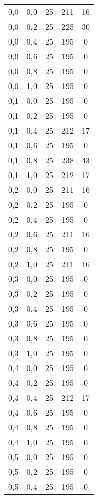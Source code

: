 \begin{center}
\begin{scriptsize}
\begin{longtable}[h]{| c | c | c || c | c |}
		0,0 & 0,0 & 25 & 211 & 16        \\
		0,0 & 0,2 & 25 & 225 & 30        \\
		0,0 & 0,4 & 25 & 195 & 0         \\
		0,0 & 0,6 & 25 & 195 & 0         \\
		0,0 & 0,8 & 25 & 195 & 0         \\
		0,0 & 1,0 & 25 & 195 & 0         \\
		\hline
		0,1 & 0,0 & 25 & 195 & 0         \\
		0,1 & 0,2 & 25 & 195 & 0         \\
		0,1 & 0,4 & 25 & 212 & 17        \\
		0,1 & 0,6 & 25 & 195 & 0         \\
		0,1 & 0,8 & 25 & 238 & 43        \\
		0,1 & 1,0 & 25 & 212 & 17        \\
		\hline
		0,2 & 0,0 & 25 & 211 & 16        \\
		0,2 & 0,2 & 25 & 195 & 0         \\
		0,2 & 0,4 & 25 & 195 & 0         \\
		0,2 & 0,6 & 25 & 211 & 16        \\
		0,2 & 0,8 & 25 & 195 & 0         \\
		0,2 & 1,0 & 25 & 211 & 16        \\
		\hline
		0,3 & 0,0 & 25 & 195 & 0         \\
		0,3 & 0,2 & 25 & 195 & 0         \\
		0,3 & 0,4 & 25 & 195 & 0         \\
		0,3 & 0,6 & 25 & 195 & 0         \\
		0,3 & 0,8 & 25 & 195 & 0         \\
		0,3 & 1,0 & 25 & 195 & 0         \\
		\hline
		0,4 & 0,0 & 25 & 195 & 0         \\
		0,4 & 0,2 & 25 & 195 & 0         \\
		0,4 & 0,4 & 25 & 212 & 17        \\
		0,4 & 0,6 & 25 & 195 & 0         \\
		0,4 & 0,8 & 25 & 195 & 0         \\
		0,4 & 1,0 & 25 & 195 & 0         \\
		\hline
		0,5 & 0,0 & 25 & 195 & 0         \\
		0,5 & 0,2 & 25 & 195 & 0         \\
		0,5 & 0,4 & 25 & 195 & 0         \\

\end{longtable}
\end{scriptsize}
\end{center}
